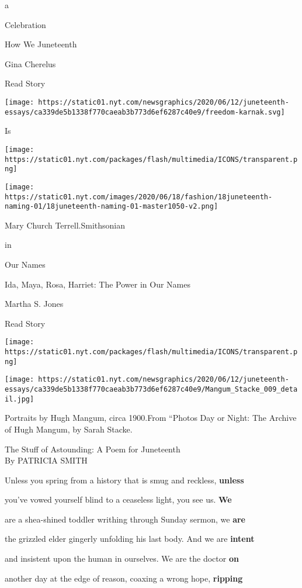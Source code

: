 a

Celebration

How We Juneteenth

Gina Cherelus

Read Story

\href{https://www.nytimes.com/2020/06/18/style/self-care/sojourner-truth-harriet-tubman-slavery-names.html}{}

\texttt{[image: https://static01.nyt.com/newsgraphics/2020/06/12/juneteenth-essays/ca339de5b1338f770caeab3b773d6ef6287c40e9/freedom-karnak.svg]}

Is

\texttt{[image: https://static01.nyt.com/packages/flash/multimedia/ICONS/transparent.png]}

\texttt{[image: https://static01.nyt.com/images/2020/06/18/fashion/18juneteenth-naming-01/18juneteenth-naming-01-master1050-v2.png]}

Mary Church Terrell.Smithsonian

in

Our Names

Ida, Maya, Rosa, Harriet: The Power in Our Names

Martha S. Jones

Read Story

\texttt{[image: https://static01.nyt.com/packages/flash/multimedia/ICONS/transparent.png]}

\texttt{[image: https://static01.nyt.com/newsgraphics/2020/06/12/juneteenth-essays/ca339de5b1338f770caeab3b773d6ef6287c40e9/Mangum\_Stacke\_009\_detail.jpg]}

Portraits by Hugh Mangum, circa 1900.From ``Photos Day or Night: The
Archive of Hugh Mangum, by Sarah Stacke.

The Stuff of Astounding: A Poem for Juneteenth\\
By PATRICIA SMITH

Unless you spring from a history that is smug and reckless,
\textbf{unless}

you've vowed yourself blind to a ceaseless light, you see us.
\textbf{We}

are a shea-shined toddler writhing through Sunday sermon, we
\textbf{are}

the grizzled elder gingerly unfolding his last body. And we are
\textbf{intent}

and insistent upon the human in ourselves. We are the doctor \textbf{on}

another day at the edge of reason, coaxing a wrong hope,
\textbf{ripping}


